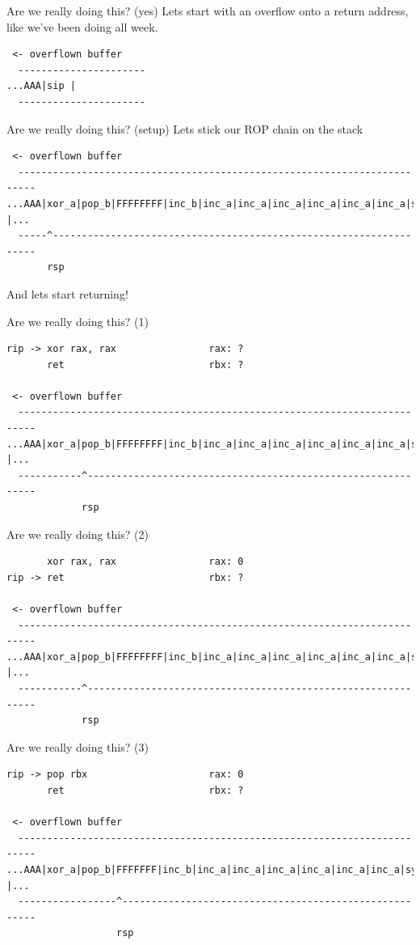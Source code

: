 \documentclass[9pt,aspectratio=169]{beamer}
\begin{document}
\begin{frame}[label={sec:org8fb26f3},fragile]{Are we really doing this? (yes)}
 Lets start with an overflow onto a return address, like we've been doing all week.

\begin{verbatim}
 <- overflown buffer 
  ----------------------
...AAA|sip |
  ----------------------
\end{verbatim}
\end{frame}
\begin{frame}[label={sec:org78a2e86},fragile]{Are we really doing this? (setup)}
 Lets stick our ROP chain on the stack

\begin{verbatim}
 <- overflown buffer 
  -------------------------------------------------------------------------
...AAA|xor_a|pop_b|FFFFFFFF|inc_b|inc_a|inc_a|inc_a|inc_a|inc_a|inc_a|sys |...
  -----^-------------------------------------------------------------------
       rsp
\end{verbatim}

And lets start returning!
\end{frame}
\begin{frame}[label={sec:org14d9b89},fragile]{Are we really doing this? (1)}
 \begin{verbatim}
rip -> xor rax, rax                rax: ?
       ret                         rbx: ?

 <- overflown buffer 
  -------------------------------------------------------------------------
...AAA|xor_a|pop_b|FFFFFFFF|inc_b|inc_a|inc_a|inc_a|inc_a|inc_a|inc_a|sys |...
  -----------^-------------------------------------------------------------
             rsp
\end{verbatim}
\end{frame}
\begin{frame}[label={sec:org1bc1082},fragile]{Are we really doing this? (2)}
 \begin{verbatim}
       xor rax, rax                rax: 0
rip -> ret                         rbx: ?

 <- overflown buffer 
  -------------------------------------------------------------------------
...AAA|xor_a|pop_b|FFFFFFFF|inc_b|inc_a|inc_a|inc_a|inc_a|inc_a|inc_a|sys |...
  -----------^-------------------------------------------------------------
             rsp
\end{verbatim}
\end{frame}
\begin{frame}[label={sec:orgcbdd5c7},fragile]{Are we really doing this? (3)}
 \begin{verbatim}
rip -> pop rbx                     rax: 0
       ret                         rbx: ?

 <- overflown buffer 
  -------------------------------------------------------------------------
...AAA|xor_a|pop_b|FFFFFFF|inc_b|inc_a|inc_a|inc_a|inc_a|inc_a|inc_a|sys |...
  -----------------^-------------------------------------------------------
                   rsp
\end{verbatim}
\end{frame}
\end{document}
